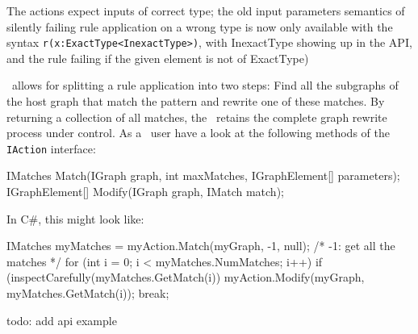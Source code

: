 The actions expect inputs of correct type; the old input parameters semantics
of silently failing rule application on a wrong type is now only available 
with the syntax \verb#r(x:ExactType<InexactType>)#, with InexactType showing up in the API,
and the rule failing if the given element is not of ExactType)

\LibGr\ allows for splitting a rule application into two steps: Find all the subgraphs of the host graph that match the pattern and rewrite one of these matches. 
By returning a collection of all matches, the \LibGr\ retains the complete graph rewrite process under control.
As a \LibGr\ user have a look at the following methods of the \verb#IAction# interface:
\begin{csharplet}
IMatches Match(IGraph graph, int maxMatches, IGraphElement[] parameters);
IGraphElement[] Modify(IGraph graph, IMatch match);
\end{csharplet}
In C\#, this might look like:
\begin{csharplet}
IMatches myMatches = myAction.Match(myGraph, -1, null); /* -1: get all the matches */
for (int i = 0; i < myMatches.NumMatches; i++)
{
	if (inspectCarefully(myMatches.GetMatch(i))
	{
		myAction.Modify(myGraph, myMatches.GetMatch(i));
		break;
  	}
}
\end{csharplet}

todo: add api example


